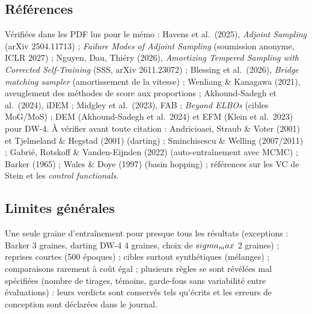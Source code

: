 \subsection{Références}
Vérifiées dans les PDF lus pour le mémo : Havens et al.\ (2025), \emph{Adjoint Sampling} (arXiv 2504.11713) ; \emph{Failure Modes of Adjoint Sampling} (soumission anonyme, ICLR 2027) ; Nguyen, Dau, Thiéry (2026), \emph{Amortizing Tempered Sampling with Corrected Self-Training} (SSS, arXiv 2611.23072) ; Blessing et al.\ (2026), \emph{Bridge matching sampler} (amortissement de la vitesse) ; Wenliang \& Kanagawa (2021), aveuglement des méthodes de score aux proportions ; Akhound-Sadegh et al.\ (2024), iDEM ; Midgley et al.\ (2023), FAB ; \emph{Beyond ELBOs} (cibles MoG/MoS) ; DEM (Akhound-Sadegh et al.\ 2024) et EFM (Klein et al.\ 2023) pour DW-4. À vérifier avant toute citation : Andricioaei, Straub \& Voter (2001) et Tjelmeland \& Hegstad (2001) (darting) ; Sminchisescu \& Welling (2007/2011) ; Gabrié, Rotskoff \& Vanden-Eijnden (2022) (auto-entraînement avec MCMC) ; Barker (1965) ; Wales \& Doye (1997) (basin hopping) ; références sur les VC de Stein et les \emph{control functionals}.

\subsection{Limites générales}
Une seule graine d'entraînement pour presque tous les résultats (exceptions : Barker 3 graines, darting DW-4 4 graines, choix de $sigma_max$ 2 graines) ; reprises courtes (500 époques) ; cibles surtout synthétiques (mélanges) ; comparaisons rarement à coût égal ; plusieurs règles se sont révélées mal spécifiées (nombre de tirages, témoins, garde-fous sans variabilité entre évaluations) : leurs verdicts sont conservés tels qu'écrits et les erreurs de conception sont déclarées dans le journal.
